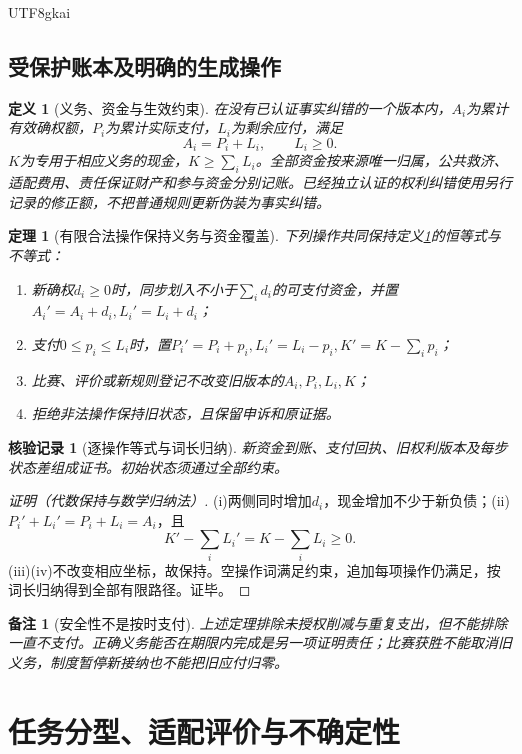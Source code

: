 \documentclass[12pt,a4paper,openany]{report}
\newtheorem{definition}{定义}[chapter]
\newtheorem{theorem}{定理}[chapter]
\newtheorem{remark}{备注}[chapter]
\newtheorem{Certificate}{核验记录}[chapter]
\begin{document}
\begin{CJK*}{UTF8}{gkai}
\section{受保护账本及明确的生成操作}
\begin{definition}[义务、资金与生效约束]
\label{def:ledger}
在没有已认证事实纠错的一个版本内，$A_i$为累计有效确权额，$P_i$为累计实际支付，$L_i$为剩余应付，满足
\[
 A_i=P_i+L_i,\qquad L_i\ge0.
\]
$K$为专用于相应义务的现金，$K\ge\sum_i L_i$。全部资金按来源唯一归属，公共救济、适配费用、责任保证财产和参与资金分别记账。已经独立认证的权利纠错使用另行记录的修正额，不把普通规则更新伪装为事实纠错。
\end{definition}
\begin{theorem}[有限合法操作保持义务与资金覆盖]
\label{thm:ledger}
下列操作共同保持定义\ref{def:ledger}的恒等式与不等式：
\begin{enumerate}[label=\textup{(\roman*)},leftmargin=3em]
\item 新确权$d_i\ge0$时，同步划入不小于$\sum_i d_i$的可支付资金，并置$A_i'=A_i+d_i,L_i'=L_i+d_i$；
\item 支付$0\le p_i\le L_i$时，置$P_i'=P_i+p_i,L_i'=L_i-p_i,K'=K-\sum_i p_i$；
\item 比赛、评价或新规则登记不改变旧版本的$A_i,P_i,L_i,K$；
\item 拒绝非法操作保持旧状态，且保留申诉和原证据。
\end{enumerate}
\end{theorem}
\begin{Certificate}[逐操作等式与词长归纳]
新资金到账、支付回执、旧权利版本及每步状态差组成证书。初始状态须通过全部约束。
\end{Certificate}
\begin{proof}[证明（代数保持与数学归纳法）]
(i)两侧同时增加$d_i$，现金增加不少于新负债；(ii) $P_i'+L_i'=P_i+L_i=A_i$，且
\[
 K'-\sum_iL_i'=K-\sum_iL_i\ge0.
\]
(iii)(iv)不改变相应坐标，故保持。空操作词满足约束，追加每项操作仍满足，按词长归纳得到全部有限路径。证毕。
\end{proof}
\begin{remark}[安全性不是按时支付]
上述定理排除未授权削减与重复支出，但不能排除一直不支付。正确义务能否在期限内完成是另一项证明责任；比赛获胜不能取消旧义务，制度暂停新接纳也不能把旧应付归零。
\end{remark}

\chapter{任务分型、适配评价与不确定性}
\label{chap:classification}

\end{CJK*}
\end{document}
